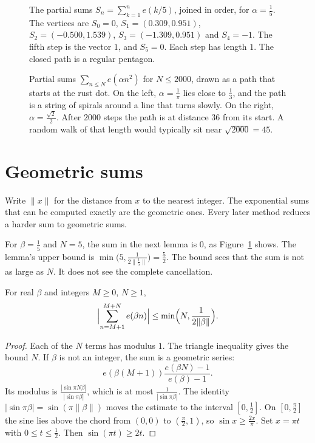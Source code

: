 \begin{figure}[ht]
\centering
{}
\caption{The partial sums $S_n=\sum_{k=1}^n e(k/5)$, joined in order, for $\alpha=\frac15$. The vertices are $S_0=0$, $S_1=(0.309,0.951)$, $S_2=(-0.500,1.539)$, $S_3=(-1.309,0.951)$ and $S_4=-1$. The fifth step is the vector $1$, and $S_5=0$. Each step has length $1$. The closed path is a regular pentagon.}
\label{fig:geompath}
\end{figure}

\begin{figure}[ht]
\centering
{}
\caption{Partial sums $\sum_{n\le N}e(\alpha n^2)$ for $N\le2000$, drawn as a path that starts at the rust dot. On the left, $\alpha=\frac1\pi$ lies close to $\frac13$, and the path is a string of spirals around a line that turns slowly. On the right, $\alpha=\frac{\sqrt2}2$. After $2000$ steps the path is at distance $36$ from its start. A random walk of that length would typically sit near $\sqrt{2000}=45$.}
\label{fig:curlicue}
\end{figure}

\section{Geometric sums}

Write $\|x\|$ for the distance from $x$ to the nearest integer. The exponential sums that can be computed exactly are the geometric ones. Every later method reduces a harder sum to geometric sums.

For $\beta=\frac15$ and $N=5$, the sum in the next lemma is $0$, as Figure~\ref{fig:geompath} shows. The lemma's upper bound is $\min\bigl(5,\frac1{2\|\frac15\|}\bigr)=\frac52$. The bound sees that the sum is not as large as $N$. It does not see the complete cancellation.

\begin{lemma}\label{lem:geom}
For real $\beta$ and integers $M\ge0$, $N\ge1$,
\[
\Bigl|\sum_{n=M+1}^{M+N}e(\beta n)\Bigr|\le\min\Bigl(N,\frac1{2\|\beta\|}\Bigr).
\]
\end{lemma}

\begin{proof}
Each of the $N$ terms has modulus $1$. The triangle inequality gives the bound $N$. If $\beta$ is not an integer, the sum is a geometric series:
\[
e(\beta(M+1))\frac{e(\beta N)-1}{e(\beta)-1}.
\]
Its modulus is $\frac{|\sin\pi N\beta|}{|\sin\pi\beta|}$, which is at most $\frac1{|\sin\pi\beta|}$. The identity $|\sin\pi\beta|=\sin(\pi\|\beta\|)$ moves the estimate to the interval $[0,\frac12]$. On $[0,\frac\pi2]$ the sine lies above the chord from $(0,0)$ to $(\frac\pi2,1)$, so $\sin x\ge\frac{2x}\pi$. Set $x=\pi t$ with $0\le t\le\frac12$. Then $\sin(\pi t)\ge 2t$.
\end{proof}

